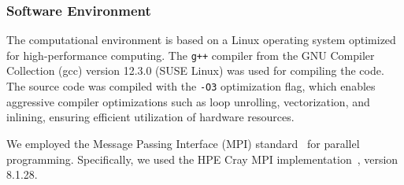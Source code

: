 \subsubsection{Software Environment}
The computational environment is based on a Linux operating system optimized for high-performance computing. The \texttt{g++} compiler from the GNU Compiler Collection (gcc) version 12.3.0 (SUSE Linux) was used for compiling the code. The source code was compiled with the \texttt{-O3} optimization flag, which enables aggressive compiler optimizations such as loop unrolling, vectorization, and inlining, ensuring efficient utilization of hardware resources.

We employed the Message Passing Interface (MPI) standard~\cite{mpi_spec} for parallel programming. Specifically, we used the HPE Cray MPI implementation~\cite{hpe_cray_mpi}, version 8.1.28.
